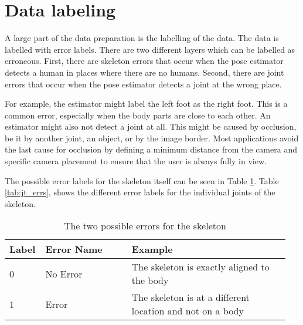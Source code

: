 \section{Data labeling}
\label{sec:data_labeling}

A large part of the data preparation is the labelling of the data. The data is labelled with error labels. There are two different layers which can be labelled as erroneous. First, there are skeleton errors that occur when the pose estimator detects a human in places where there are no humans. Second, there are joint errors that occur when the pose estimator detects a joint at the wrong place. 

For example, the estimator might label the left foot as the right foot. This is a common error, especially when the body parts are close to each other. An estimator might also not detect a joint at all. This might be caused by occlusion, be it by another joint, an object, or by the image border. Most applications avoid the last cause for occlusion by defining a minimum distance from the camera and specific camera placement to ensure that the user is always fully in view.

The possible error labels for the skeleton itself can be seen in Table \ref{tab:skel_errs}. Table \ref{tab:jt_errs}, shows the different error labels for the individual joints of the skeleton.

\begin{table}[htb]
  \centering
  \caption{The two possible errors for the skeleton}
  \label{tab:skel_errs}
  \begin{tabular}{p{0.1\linewidth}p{0.3\linewidth}p{0.55\linewidth}}
  \hline
  \textbf{Label} & \textbf{Error Name} & \textbf{Example} \\ \hline
  0                    & No Error            & The skeleton is exactly aligned to the body               \\
  1                    & Error               & The skeleton is at a different location and not on a body \\ \hline
  \end{tabular} 
\end{table}

